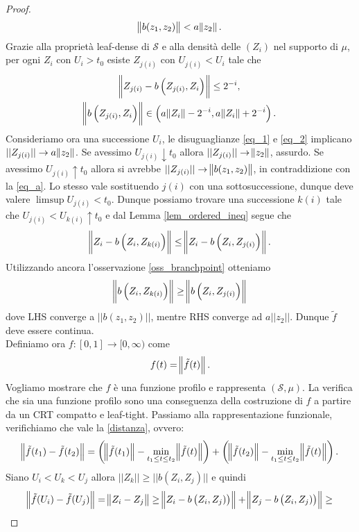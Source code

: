 \documentclass[11pt, twoside]{report}
\newcommand{\Ss}{\mathscr{S}}
\theoremstyle{definition}
\theoremstyle{plain}
\theoremstyle{remark}
\numberwithin{equation}{chapter}
\begin{document}
\begin{proof}
\begin{equation}\label{eq_a}
\norm{b(z_1,z_2)}< a\norm{z_2}.
\end{equation}
Grazie alla proprietà leaf-dense di $\Ss$ e alla densità delle $(Z_i)$ nel supporto di $\mu$, per ogni $Z_i$ con $U_i>t_0$ esiste $Z_{j(i)}$ con $U_{j(i)}<U_i$ tale che
\begin{gather}
\norm{Z_{j(i)}-b\left(Z_{j(i)}, Z_i\right)}\leq 2^{-i}, \label{eq_1} \\
\norm{b\left(Z_{j(i)}, Z_i\right)} \in \left(a\norm{Z_i}-2^{-i}, a\norm{Z_i}+2^{-i}\right).\label{eq_2}
\end{gather}
Consideriamo ora una successione $U_i$, le disuguaglianze \eqref{eq_1} e \eqref{eq_2} implicano ${||Z_{j(i)}||\rightarrow a\norm{z_2}}$. Se avessimo $U_{j(i)}\downarrow t_0$ allora $||Z_{j(i)}||\rightarrow \norm{z_2}$, assurdo.
Se avessimo $U_{j(i)}\uparrow t_0$ allora si avrebbe $||Z_{j(i)}||\to \norm{b(z_1,z_2)}$, in contraddizione con la \eqref{eq_a}. Lo stesso vale sostituendo $j(i)$ con una sottosuccessione, dunque deve valere $\limsup U_{j(i)}<t_0$.
Dunque possiamo trovare una successione $k(i)$ tale che $U_{j(i)}<U_{k(i)}\uparrow t_0$ e dal Lemma \ref{lem_ordered_ineq} segue che
$$ \norm{Z_i - b\left(Z_i, Z_{k(i)}\right)}\leq \norm{Z_i - b\left(Z_i, Z_{j(i)}\right)}.$$
Utilizzando ancora l'osservazione \ref{oss_branchpoint} otteniamo
$$\norm{b\left(Z_i,Z_{k(i)}\right)}\geq \norm{b\left(Z_i,Z_{j(i)}\right)}$$
dove LHS converge a $||b(z_1,z_2)||$, mentre RHS converge ad $a ||z_2||$. Dunque $\tilde{f}$ deve essere continua.\\
Definiamo ora $f:[0,1]\longrightarrow[0,\infty)$ come
$$f(t)=\norm{\tilde{f}(t)}.$$
Vogliamo mostrare che $f$ è una funzione profilo e rappresenta $(\Ss,\mu)$. La verifica che sia una funzione profilo sono una conseguenza della costruzione di $f$ a partire da un CRT compatto e leaf-tight. Passiamo alla rappresentazione funzionale, verifichiamo che vale la \eqref{distanza}, ovvero:
\begin{equation}\label{distanza_2}
\norm{\tilde{f}(t_1)-\tilde{f}(t_2)}=\left(\norm{\tilde{f}(t_1)} - \min\limits_{t_1\leq t\leq t_2} \norm{\tilde{f}(t)}\right) +  \left(\norm{\tilde{f}(t_2)}- \min\limits_{t_1\leq t\leq t_2}\norm{\tilde{f}(t)}\right).
\end{equation}
Siano $U_i<U_k<U_j$ allora $||Z_k||\geq ||b(Z_i,Z_j)||$ e quindi 
\begin{gather}
\norm{\tilde{f}(U_i)-\tilde{f}(U_j)}=\norm{Z_i-Z_j}\geq \norm{Z_i-b\left(Z_i, Z_j)\right)}+\norm{Z_j - b\left(Z_i, Z_j)\right)}\geq \nonumber \\

\end{gather}
\end{proof}
\end{document}
